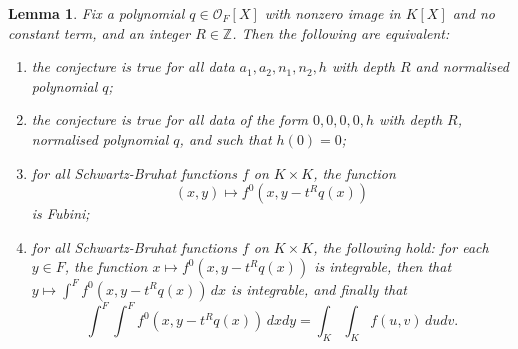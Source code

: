 \documentclass{lmsMODIFIED}
\newtheorem{lemma}[theorem]{Lemma}     %
\newcommand{\bb}[1]{\mathbb{#1}}
\newcommand{\roi}{\mathcal{O}}
\begin{document}
\begin{lemma}\label{lemma_reduction}
Fix a polynomial $q\in\roi_{F}[X]$ with nonzero image in $ K [X]$ and no constant term, and an integer $R\in\bb{Z}$. Then the following are equivalent:
\begin{enumerate}
\item the conjecture is true for all data $a_1,a_2,n_1,n_2,h$ with depth $R$ and normalised polynomial $q$;
\item the conjecture is true for all data of the form $0,0,0,0,h$ with depth $R$, normalised polynomial $q$, and such that $h(0)=0$;
\item for all Schwartz-Bruhat functions $f$ on $K\times K$, the function \[(x,y)\mapsto f^0(x,y-t^Rq(x))\] is Fubini;
\item for all Schwartz-Bruhat functions $f$ on $K\times K$, the following hold: for each $y\in F$, the function $x\mapsto f^0(x,y-t^Rq(x))$ is integrable, then that $y\mapsto\int^Ff^0(x,y-t^Rq(x))\,dx$ is integrable, and finally that \[\int^F\int^F f^0(x,y-t^Rq(x))\,dxdy=\int_K\int_K f(u,v)\,dudv.\]
\end{enumerate}
\end{lemma}
\end{document}

